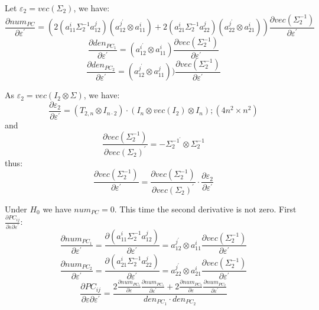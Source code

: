 \documentclass[a4paper,10pt]{article}
\begin{document}
Let $\varepsilon_{2} = vec(\Sigma_{2})$, we have:
\begin{equation}
\frac{\partial num_{PC}}{\partial \varepsilon^{'}} = (2 (a_{11}^{i} \Sigma_{2}^{-1} a_{12}^{j}) (a_{12}^{j^{'}} \otimes a_{11}^{i}) +
2 (a_{21}^{i} \Sigma_{2}^{-1} a_{22}^{j}) (a_{22}^{j^{'}} \otimes a_{21}^{i}) )
\frac{\partial vec(\Sigma_{2}^{-1})}{\partial \varepsilon^{'}}
\end{equation}
\begin{equation}
\frac{\partial den_{PC_{1}}}{\partial \varepsilon^{'}} = (a_{12}^{i^{'}} \otimes a_{11}^{i}) 
\frac{\partial vec(\Sigma_{2}^{-1})}{\partial \varepsilon^{'}}
\end{equation}
\begin{equation}
\frac{\partial den_{PC_{2}}}{\partial \varepsilon^{'}} = (a_{12}^{j^{'}} \otimes a_{11}^{j}) )
\frac{\partial vec(\Sigma_{2}^{-1})}{\partial \varepsilon^{'}}
\end{equation}

As $\varepsilon_{2} = vec(I_{2} \otimes \Sigma)$, we have:
\begin{equation}
\frac{\partial \varepsilon_{2}}{\partial \varepsilon^{'}} = (T_{2,n} \otimes I_{n \cdot 2}) \cdot (I_{n} \otimes vec(I_{2}) \otimes I_{n}); (4n^{2} \times n^{2})
\end{equation}
and
\begin{equation}
\frac{\partial vec(\Sigma_{2}^{-1})}{\partial vec(\Sigma_{2})^{'}} = -\Sigma_{2}^{-1^{'}} \otimes \Sigma_{2}^{-1}
\end{equation}
thus:
\begin{equation}
\frac{\partial vec(\Sigma_{2}^{-1})}{\partial \varepsilon^{'}} = \frac{\partial vec(\Sigma_{2}^{-1})}{\partial vec(\Sigma_{2})^{'}} \cdot \frac{\partial \varepsilon_{2}}{\partial \varepsilon^{'}}
\end{equation}

Under $H_0$ we have $num_{PC} = 0$. This time the second derivative is not zero. First $\frac{\partial PC_{ij}}{\partial \varepsilon \partial \varepsilon^{'}}$:
\begin{equation}
\frac{\partial num_{PC_{1}}}{\partial \varepsilon^{'}} = \frac{\partial (a_{11}^{i} \Sigma_{2}^{-1} a_{12}^{j})}{\partial \varepsilon^{'}} = a_{12}^{j^{'}} \otimes a_{11}^{i} \frac{\partial vec(\Sigma_{2}^{-1})}{\partial \varepsilon^{'}}
\end{equation}
\begin{equation}
\frac{\partial num_{PC_{2}}}{\partial \varepsilon^{'}} = \frac{\partial (a_{21}^{i} \Sigma_{2}^{-1} a_{22}^{j})}{\partial \varepsilon^{'}} = a_{22}^{j^{'}} \otimes a_{21}^{i} \frac{\partial vec(\Sigma_{2}^{-1})}{\partial \varepsilon^{'}}
\end{equation}
\begin{equation}
\frac{\partial PC_{ij}}{\partial \varepsilon \partial \varepsilon^{'}} = \frac{2 \frac{\partial num_{PC_{1}}}{\partial \varepsilon} \frac{\partial num_{PC_{1}}}{\partial \varepsilon^{'}} + 2 \frac{\partial num_{PC_{2}}}{\partial \varepsilon} \frac{\partial num_{PC_{2}}}{\partial \varepsilon^{'}}}{den_{PC_{1}} \cdot den_{PC_{2}}}
\end{equation}
\end{document}
